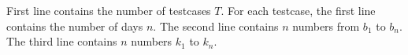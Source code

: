 First line contains the number of testcases $T$. 
For each testcase, the first line contains the number of days $n$. 
The second line contains $n$ numbers from $b_1$ to $b_n$.
The third line contains $n$ numbers $k_1$ to $k_n$.

